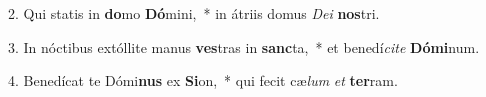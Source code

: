 2. Qui statis in \textbf{do}mo \textbf{Dó}mini,~*  in átriis domus \textit{De}\textit{i} \textbf{nos}tri.\

3. In nóctibus extóllite manus \textbf{ves}tras in \textbf{sanc}ta,~*  et benedí\textit{ci}\textit{te} \textbf{Dó}\textbf{mi}num.\

4. Benedícat te Dómi\textbf{nus} ex \textbf{Si}on,~*  qui fecit cæ\textit{lum} \textit{et} \textbf{ter}ram.\

